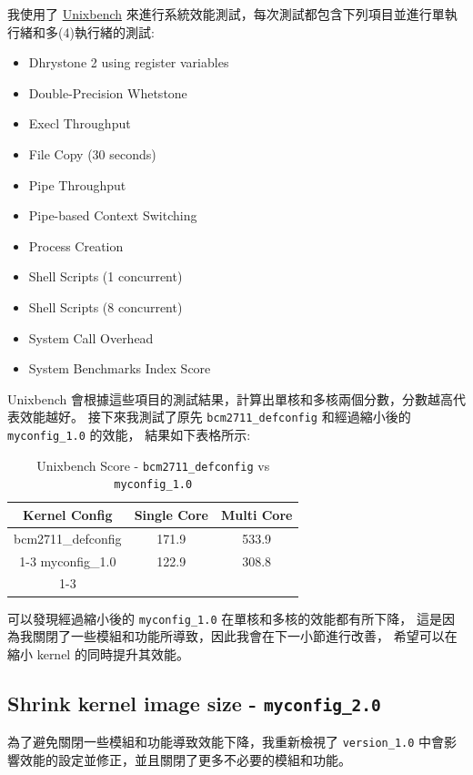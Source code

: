 \documentclass[a4paper, oneside, final, 12pt]{scrartcl} %
\begin{document}
我使用了 \href{https://github.com/kdlucas/byte-unixbench}{Unixbench}
來進行系統效能測試，每次測試都包含下列項目並進行單執行緒和多(4)執行緒的測試:

\begin{itemize}
  \item Dhrystone 2 using register variables
  \item Double-Precision Whetstone
  \item Execl Throughput
  \item File Copy (30 seconds)
  \item Pipe Throughput
  \item Pipe-based Context Switching
  \item Process Creation
  \item Shell Scripts (1 concurrent)
  \item Shell Scripts (8 concurrent)
  \item System Call Overhead
  \item System Benchmarks Index Score
\end{itemize}

Unixbench 會根據這些項目的測試結果，計算出單核和多核兩個分數，分數越高代表效能越好。
接下來我測試了原先 \lstinline{bcm2711_defconfig} 和經過縮小後的 \lstinline{myconfig_1.0} 的效能，
結果如下表格所示:

\begin{table}[ht]
  \centering
    \begin{tabular}{|*{3}{c|}}
        \hline
    Kernel Config    & Single Core  & Multi Core  \\
        \hline
    bcm2711\_defconfig  &  171.9    &  533.9 \\  \cline{1-3}
    myconfig\_1.0       &  122.9    &  308.8 \\  \cline{1-3}
        \hline
    \end{tabular}
  \caption{Unixbench Score - \lstinline{bcm2711_defconfig} vs \lstinline{myconfig_1.0}}
\end{table}

可以發現經過縮小後的 \lstinline{myconfig_1.0} 在單核和多核的效能都有所下降，
這是因為我關閉了一些模組和功能所導致，因此我會在下一小節進行改善，
希望可以在縮小 kernel 的同時提升其效能。

\subsection{Shrink kernel image size - \lstinline{myconfig_2.0}}

為了避免關閉一些模組和功能導致效能下降，我重新檢視了 \lstinline{version_1.0}
中會影響效能的設定並修正，並且關閉了更多不必要的模組和功能。
\end{document}

